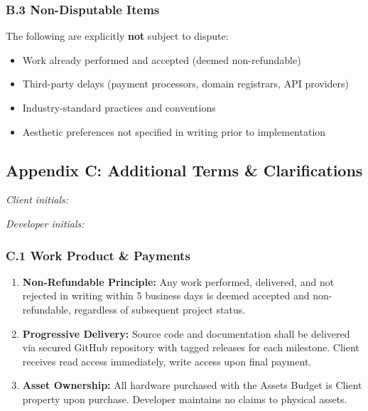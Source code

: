 \documentclass[11pt, a4paper]{article}
\begin{document}
\subsubsection*{B.3 Non-Disputable Items}
The following are explicitly \textbf{not} subject to dispute:
\begin{itemize}[leftmargin=*]
\item Work already performed and accepted (deemed non-refundable)
\item Third-party delays (payment processors, domain registrars, API providers)
\item Industry-standard practices and conventions
\item Aesthetic preferences not specified in writing prior to implementation
\end{itemize}

\subsection*{Appendix C: Additional Terms \& Clarifications}
\label{appendix:terms}
\noindent
\begin{minipage}[t]{0.45\textwidth}
\textit{Client initials: }\TextField[name=init_client_C,width=1.6cm,bordercolor={0.7 0.7 0.7}]{}
\end{minipage}%
\hfill%
\begin{minipage}[t]{0.45\textwidth}
\raggedleft
\textit{Developer initials: }\TextField[name=init_dev_C,width=1.6cm,bordercolor={0.7 0.7 0.7}]{}
\end{minipage}
\vspace{0.3cm}

\subsubsection*{C.1 Work Product \& Payments}
\begin{enumerate}[label=\alph*.]
\item \textbf{Non-Refundable Principle:} Any work performed, delivered, and not rejected in writing within 5 business days is deemed accepted and non-refundable, regardless of subsequent project status.
\item \textbf{Progressive Delivery:} Source code and documentation shall be delivered via secured GitHub repository with tagged releases for each milestone. Client receives read access immediately, write access upon final payment.
\item \textbf{Asset Ownership:} All hardware purchased with the Assets Budget is Client property upon purchase. Developer maintains no claims to physical assets.
\end{enumerate}
\end{document}
